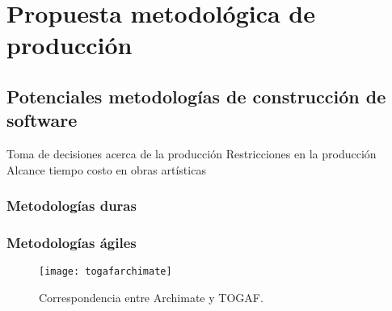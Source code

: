 
\chapter{Propuesta metodológica de producción}

\section{Potenciales metodologías de construcción de software}

Toma de decisiones acerca de la producción
Restricciones en la producción
Alcance tiempo costo en obras artísticas

\subsection{Metodologías duras}

\subsection{Metodologías ágiles}









\begin{figure}[h]\label{togafarchimate}
\centering
\texttt{[image: togafarchimate]}
\caption{Correspondencia entre Archimate y TOGAF.}
\end{figure}
